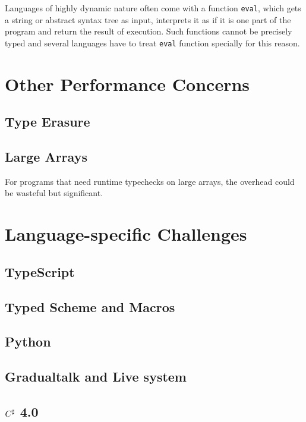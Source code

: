 Languages of highly dynamic nature often come with a function \texttt{eval}, which
gets a string or abstract syntax tree as input, interprets it as if it is one part of the program
and return the result of execution. Such functions cannot be precisely typed and several languages
have to treat \texttt{eval} function specially for this reason.

\section{Other Performance Concerns}

\subsection{Type Erasure}

\subsection{Large Arrays}

For programs that need runtime typechecks on large arrays,
the overhead could be wasteful but significant.


\section{Language-specific Challenges}

\subsection{TypeScript}

\subsection{Typed Scheme and Macros}

\subsection{Python}

\subsection{Gradualtalk and Live system}

\subsection{$C^\sharp$ 4.0}

